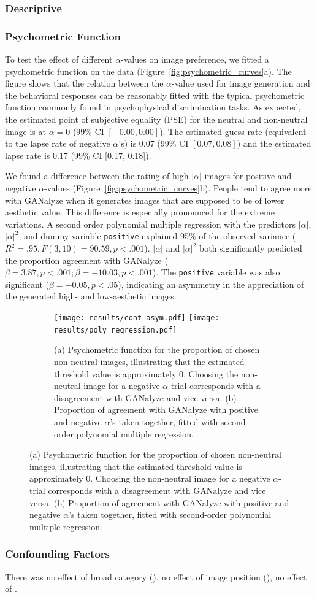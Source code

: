 \documentclass[../main.tex]{subfiles}
\begin{document}
	\subsubsection{Descriptive}
	
	
	
	\subsubsection{Psychometric Function}
	To test the effect of different $\alpha$-values on image preference, we fitted a psychometric function on the data (Figure~\ref{fig:psychometric_curves}a). The figure shows that the relation between the $\alpha$-value used for image generation and the behavioral responses can be reasonably fitted with the typical psychometric function commonly found in psychophysical discrimination tasks. As expected, the estimated point of subjective equality (PSE) for the neutral and non-neutral image is at $\alpha = 0$ (99\% CI $[-0.00, 0.00]$). The estimated guess rate (equivalent to the lapse rate of negative $\alpha$'s) is 0.07 (99\% CI $[0.07, 0.08]$) and the estimated lapse rate is 0.17 (99\% CI [0.17, 0.18]).
	
	We found a difference between the rating of high-$|\alpha|$ images for positive and negative $\alpha$-values (Figure~\ref{fig:psychometric_curves}b). People tend to agree more with GANalyze when it generates images that are supposed to be of lower aesthetic value. This difference is especially pronounced for the extreme variations. A second order polynomial multiple regression with the predictors $|\alpha|$, $|\alpha|^2$, and dummy variable \texttt{positive} explained 95\% of the observed variance ($R^2=.95, F(3,10)=90.59, p<.001$). $|\alpha|$ and $|\alpha|^2$ both significantly predicted the proportion agreement with GANalyze ($\beta=3.87, p<.001; \beta=-10.03, p<.001$). The \texttt{positive} variable was also significant ($\beta=-0.05, p<.05$), indicating an asymmetry in the appreciation of the generated high- and low-aesthetic images.  

	\begin{figure}[h!]
		\caption{Behavioral Results from the Image Rating Task}
		\label{fig:psychometric_curves}
		\centering
		\begin{subfigure}{\textwidth}
			{\centering
			\texttt{[image: results/cont\_asym.pdf]}
			\hfill
			\texttt{[image: results/poly\_regression.pdf]}}
			\caption{\normalfont (a) Psychometric function for the proportion of chosen non-neutral images, illustrating that the estimated threshold value is approximately 0. Choosing the non-neutral image for a negative $\alpha$-trial corresponds with a disagreement with GANalyze and vice versa. (b) Proportion of agreement with GANalyze with positive and negative $\alpha$'s taken together, fitted with second-order polynomial multiple regression.}
		\end{subfigure}
	\end{figure}

	\subsubsection{Confounding Factors}
	There was no effect of broad category (), no effect of image position (), no effect of  .
	
\end{document}
